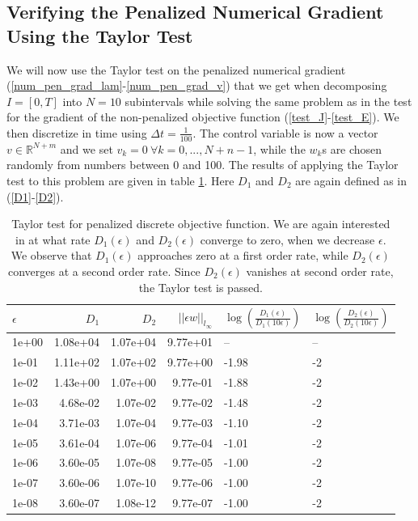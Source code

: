 \subsection{Verifying the Penalized Numerical Gradient Using the Taylor Test}
We will now use the Taylor test on the penalized numerical gradient (\ref{num_pen_grad_lam}-\ref{num_pen_grad_v}) that we get when decomposing $I=[0,T]$ into $N=10$ subintervals while solving the same problem as in the test for the gradient of the non-penalized objective function (\ref{test_J}-\ref{test_E}). We then discretize in time using $\Delta t=\frac{1}{100}$. The control variable is now a vector $v\in\mathbb{R}^{N+m}$ and we set $v_k=0 \ \forall k=0,...,N+n-1$, while the $w_k$s are chosen randomly from numbers between 0 and 100. The results of applying the Taylor test to this problem are given in table \ref{Taylor_tab2}. Here $D_1$ and $D_2$ are again defined as in (\ref{D1}-\ref{D2}).
\\
\begin{table}[!h]
\centering
\caption{Taylor test for penalized discrete objective function. We are again interested in at what rate $D_1(\epsilon)$ and $D_2(\epsilon)$ converge to zero, when we decrease $\epsilon$. We observe that $D_1(\epsilon)$ approaches zero at a first order rate, while $D_2(\epsilon)$ converges at a second order rate. Since $D_2(\epsilon)$ vanishes at second order rate, the Taylor test is passed. }
\label{Taylor_tab2}
\centering
\begin{tabular}{lrrrll}
\toprule
{}$\epsilon$&  $D_1$ &  $D_2$ &        $||\epsilon w||_{l_{\infty}}$ &    $ \log(\frac{D_1(\epsilon)}{D_1(10\epsilon)})$ &    $ \log(\frac{D_2(\epsilon)}{D_2(10\epsilon)})$  \\
\midrule
1e+00 &  1.08e+04 &        1.07e+04 &  9.77e+01 &       -- &       -- \\
1e-01 &  1.11e+02 &        1.07e+02 &  9.77e+00 &  -1.98 &  -2 \\
1e-02 &  1.43e+00 &        1.07e+00 &  9.77e-01 &  -1.88 &  -2 \\
1e-03 &  4.68e-02 &        1.07e-02 &  9.77e-02 &  -1.48 &  -2 \\
1e-04 &  3.71e-03 &        1.07e-04 &  9.77e-03 &   -1.10 &  -2 \\
1e-05 &  3.61e-04 &        1.07e-06 &  9.77e-04 &  -1.01 &  -2 \\
1e-06 &  3.60e-05 &        1.07e-08 &  9.77e-05 &  -1.00 &  -2 \\
1e-07 &  3.60e-06 &        1.07e-10 &  9.77e-06 &  -1.00 &  -2 \\
1e-08 &  3.60e-07 &        1.08e-12 &  9.77e-07 &  -1.00 &  -2 \\
\bottomrule
\end{tabular}
\end{table}
